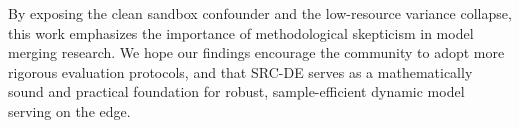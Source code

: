 By exposing the clean sandbox confounder and the low-resource variance collapse, this work emphasizes the importance of methodological skepticism in model merging research. We hope our findings encourage the community to adopt more rigorous evaluation protocols, and that SRC-DE serves as a mathematically sound and practical foundation for robust, sample-efficient dynamic model serving on the edge.
